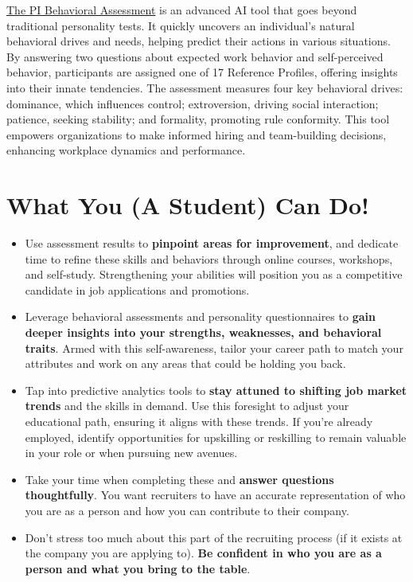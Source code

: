 \documentclass[
]{book}
\begin{document}
\href{https://www.predictiveindex.com/assessments/behavioral-assessment/?creative=655858294556\&keyword=predictive\%20personality\%20test\&matchtype=b\&network=g\&device=c\&utm_source=google\&utm_medium=ppc\&utm_content=bofu-brand-low-value\&device=c\&matchtype=b\&utm_term=predictive\%20personality\%20test\&gad=1\&gclid=Cj0KCQjwldKmBhCCARIsAP-0rfw2xB87svR2BFTESJ6nSMzDqIs8ni8VKXiD1robOSabO6uU7wTWjagaAoHUEALw_wcB}{The PI Behavioral Assessment} is an advanced AI tool that goes beyond traditional personality tests. It quickly uncovers an individual's natural behavioral drives and needs, helping predict their actions in various situations. By answering two questions about expected work behavior and self-perceived behavior, participants are assigned one of 17 Reference Profiles, offering insights into their innate tendencies. The assessment measures four key behavioral drives: dominance, which influences control; extroversion, driving social interaction; patience, seeking stability; and formality, promoting rule conformity. This tool empowers organizations to make informed hiring and team-building decisions, enhancing workplace dynamics and performance.

\hypertarget{what-you-a-student-can-do-3}{%
\section{What You (A Student) Can Do!}\label{what-you-a-student-can-do-3}}

\begin{itemize}
\item
  Use assessment results to \textbf{pinpoint areas for improvement}, and dedicate time to refine these skills and behaviors through online courses, workshops, and self-study. Strengthening your abilities will position you as a competitive candidate in job applications and promotions.
\item
  Leverage behavioral assessments and personality questionnaires to \textbf{gain deeper insights into your strengths, weaknesses, and behavioral traits}. Armed with this self-awareness, tailor your career path to match your attributes and work on any areas that could be holding you back.
\item
  Tap into predictive analytics tools to \textbf{stay attuned to shifting job market trends} and the skills in demand. Use this foresight to adjust your educational path, ensuring it aligns with these trends. If you're already employed, identify opportunities for upskilling or reskilling to remain valuable in your role or when pursuing new avenues.
\item
  Take your time when completing these and \textbf{answer questions thoughtfully}. You want recruiters to have an accurate representation of who you are as a person and how you can contribute to their company.
\item
  Don't stress too much about this part of the recruiting process (if it exists at the company you are applying to). \textbf{Be confident in who you are as a person and what you bring to the table}.
\end{itemize}
\end{document}
